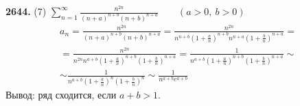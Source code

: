 \documentclass[12pt, oneside]{memoir}
\begin{document}
\textbf{2644.} (7) $\displaystyle \sum_{n=1}^\infty \frac{n^{2n}}{(n+a)^{n+b} (n+b)^{n+a}} \qquad (a>0,\ b>0)$
\begin{multline*}
    a_n = \frac{n^{2n}}{(n+a)^{n+b} (n+b)^{n+a}} =
    \frac{n^{2n}}{n^{n+b} \left(1 + \frac{a}{n}\right)^{n+b} n^{n+a} \left(1 + \frac{b}{n}\right)^{n+a}} = \\
    = \frac{n^{2n}}{n^{2n}n^{a+b} \left(1 + \frac{a}{n}\right)^{n+b} \left(1 + \frac{b}{n}\right)^{n+a}} =
    \frac{1}{n^{a+b} \left(1 + \frac{a}{n}\right)^{n+b} \left(1 + \frac{b}{n}\right)^{n+a}} \sim \\
    \sim \frac{1}{n^{a+b} \left(1 + \frac{a}{n}\right)^{n} \left(1 + \frac{b}{n}\right)^{n}} \sim
    \frac{1}{n^{a+b} e^{a+b}}
\end{multline*}
Вывод: ряд сходится, если $a+b > 1$.
\end{document}

